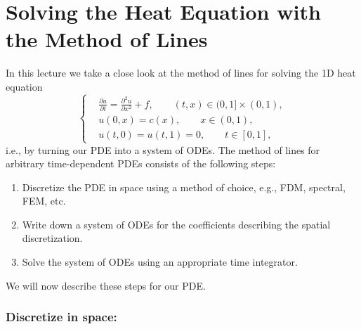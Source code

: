 \chapter{Solving the Heat Equation with the Method of Lines}

In this lecture we take a close look at the method of lines for solving 
the 1D heat equation 
\begin{equation*}
    \left\{
\begin{aligned}
    & \frac{\partial u}{\partial t} = \frac{\partial^2 u}{\partial x^2} 
    + f, \qquad (t, x) \in (0, 1] \times (0, 1), \\
    & u(0, x) = c(x), \qquad x \in(0,1), \\ 
    & u(t, 0) = u(t, 1) = 0, \qquad t \in [0, 1], 
\end{aligned}
    \right.
\end{equation*}
i.e., by turning our PDE into a system of ODEs. The 
method of lines for arbitrary time-dependent PDEs consists of the following steps:

\begin{enumerate}
    \item Discretize the PDE in space using a method of choice, e.g., FDM, spectral, FEM, etc.
    \item Write down a system of ODEs for the coefficients describing the spatial discretization. 
    \item Solve the system of ODEs using an appropriate time integrator. 
\end{enumerate}

We will now describe these steps for our PDE. 

\subsection*{Discretize in space:}

